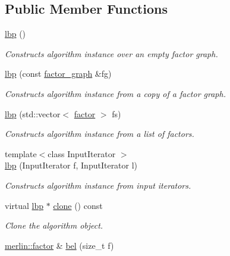 \subsection*{Public Member Functions}
\begin{DoxyCompactItemize}
\item 
\hyperlink{classmerlin_1_1lbp_aec902b835fbb159f872a9101cd007b7e}{lbp} ()\hypertarget{classmerlin_1_1lbp_aec902b835fbb159f872a9101cd007b7e}{}\label{classmerlin_1_1lbp_aec902b835fbb159f872a9101cd007b7e}

\begin{DoxyCompactList}\small\item\em Constructs algorithm instance over an empty factor graph. \end{DoxyCompactList}\item 
\hyperlink{classmerlin_1_1lbp_a46fbc09692ece741ba66da1a36b84fb3}{lbp} (const \hyperlink{classmerlin_1_1factor__graph}{factor\+\_\+graph} \&fg)
\begin{DoxyCompactList}\small\item\em Constructs algorithm instance from a copy of a factor graph. \end{DoxyCompactList}\item 
\hyperlink{classmerlin_1_1lbp_a5caa6f3d93015569031933bbce944aa4}{lbp} (std\+::vector$<$ \hyperlink{classmerlin_1_1factor}{factor} $>$ fs)
\begin{DoxyCompactList}\small\item\em Constructs algorithm instance from a list of factors. \end{DoxyCompactList}\item 
{\footnotesize template$<$class Input\+Iterator $>$ }\\\hyperlink{classmerlin_1_1lbp_ad4c9c7ba780848817d9f49e2e7537fb3}{lbp} (Input\+Iterator f, Input\+Iterator l)
\begin{DoxyCompactList}\small\item\em Constructs algorithm instance from input iterators. \end{DoxyCompactList}\item 
virtual \hyperlink{classmerlin_1_1lbp}{lbp} $\ast$ \hyperlink{classmerlin_1_1lbp_a4d2e317106a40ca49074f898a7a46fb0}{clone} () const 
\begin{DoxyCompactList}\small\item\em Clone the algorithm object. \end{DoxyCompactList}\item 
\hyperlink{classmerlin_1_1factor}{merlin\+::factor} \& \hyperlink{classmerlin_1_1lbp_a35585f32c077c507ed3582ee72d9e0d1}{bel} (size\+\_\+t f)\hypertarget{classmerlin_1_1lbp_a35585f32c077c507ed3582ee72d9e0d1}{}\label{classmerlin_1_1lbp_a35585f32c077c507ed3582ee72d9e0d1}


\end{DoxyCompactItemize}

